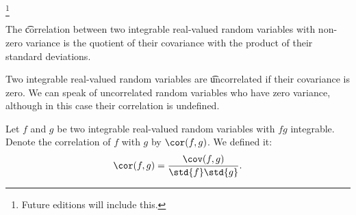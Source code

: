 

\footnote{Future editions will include this.}


The \t{correlation} between two integrable real-valued random variables with non-zero variance is the quotient of their covariance with the product of their standard deviations.

Two integrable real-valued random variables are \t{uncorrelated}
if their covariance is zero.
We can speak of uncorrelated random variables who have zero variance, although in this case their correlation is undefined.


Let $f$ and $g$
be two integrable
real-valued
random variables
with $fg$ integrable.
Denote the correlation
of $f$ with $g$
by $\cor(f, g)$.
We defined it:
\[
  \cor(f, g) = \frac{\cov(f,g)}{\std{f}\std{g}}.
\]

\blankpage
